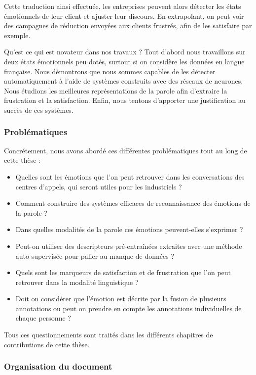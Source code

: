 Cette traduction ainsi effectuée, les entreprises peuvent alors détecter les états émotionnels de leur client et ajuster leur discours. En extrapolant, on peut voir des campagnes de réduction envoyées aux clients frustrés, afin de les satisfaire par exemple.

Qu'est ce qui est novateur dans nos travaux ? Tout d'abord nous travaillons sur deux états émotionnels peu dotés, surtout si on considère les données en langue française. Nous démontrons que nous sommes capables de les détecter automatiquement à l'aide de systèmes construits avec des réseaux de neurones. Nous étudions les meilleures représentations de la parole afin d'extraire la frustration et la satisfaction. Enfin, nous tentons d'apporter une justification au succès de ces systèmes.

\subsubsection{Problématiques}
Concrétement, nous avons abordé ces différentes problématiques tout au long de cette thèse :
\begin{itemize}
  \item Quelles sont les émotions que l'on peut retrouver dans les conversations des centres d'appels, qui seront utiles pour les industriels ?
  \item Comment construire des systèmes efficaces de reconnaissance des émotions de la parole ?
  \item Dans quelles modalités de la parole ces émotions peuvent-elles s'exprimer ?
  \item Peut-on utiliser des descripteurs pré-entraînées extraites avec une méthode auto-supervisée pour palier au manque de données ?
  \item Quels sont les marqueurs de satisfaction et de frustration que l'on peut retrouver dans la modalité linguistique ?
  \item Doit on considérer que l'émotion est décrite par la fusion de plusieurs annotations ou peut on prendre en compte les annotations individuelles de chaque personne ?
\end{itemize}

Tous ces questionnements sont traités dans les différents chapitres de contributions de cette thèse.

\subsubsection{Organisation du document}

